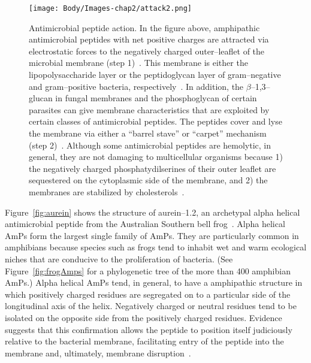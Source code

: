     \begin{figure}[phtb] \centering
    \texttt{[image: Body/Images-chap2/attack2.png]}
    \caption[Antimicrobial peptide action]{
        Antimicrobial peptide action.  In the
        figure above, amphipathic antimicrobial
        peptides with net positive charges are
        attracted via electrostatic forces to
        the negatively charged outer--leaflet
        of the microbial membrane (step
        1)~\cite{zasloff2002antimicrobial}.  This
        membrane is either the lipopolysaccharide
        layer or the peptidoglycan layer of
        gram--negative and gram--positive bacteria,
        respectively~\cite{epand1999diversity}.
        In addition, the $\beta$--1,3--glucan in
        fungal membranes and the phosphoglycan
        of certain parasites can give membrane
        characteristics that are exploited
        by certain classes of antimicrobial
        peptides.  The peptides cover and lyse
        the membrane via either a ``barrel
        stave'' or ``carpet'' mechanism (step
        2)~\cite{shai2002mode}.  Although some
        antimicrobial peptides are hemolytic,
        in general, they are not damaging to
        multicellular organisms because 1) the
        negatively charged phosphatydilserines
        of their outer leaflet are sequestered
        on the cytoplasmic side of the membrane,
        and 2) the membranes are stabilized by
        cholesterols~\cite{zasloff2002antimicrobial}.
    } \label{fig:peptideAction} \end{figure}


Figure~\vref{fig:aurein} shows the structure of aurein--1.2, an
archetypal alpha helical antimicrobial peptide from the Australian
Southern bell frog~\cite{wang2005correlation}.  Alpha helical AmPs
form the largest single family of AmPs.  They are particularly
common in amphibians because species such as frogs tend to inhabit
wet and warm ecological niches that are conducive to the
proliferation of bacteria.  (See Figure~\ref{fig:frogAmps} for a
phylogenetic tree of the more than 400 amphibian AmPs.)  Alpha
helical AmPs tend, in general, to have a amphipathic structure in
which positively charged residues are segregated on to a particular
side of the longitudinal axis of the helix.  Negatively charged or
neutral residues tend to be isolated on the opposite side from the
positively charged residues.  Evidence suggests that this
confirmation allows the peptide to position itself judiciously
relative to the bacterial membrane, facilitating entry of the
peptide into the membrane and, ultimately, membrane
disruption~\cite{zasloff2002antimicrobial}.

